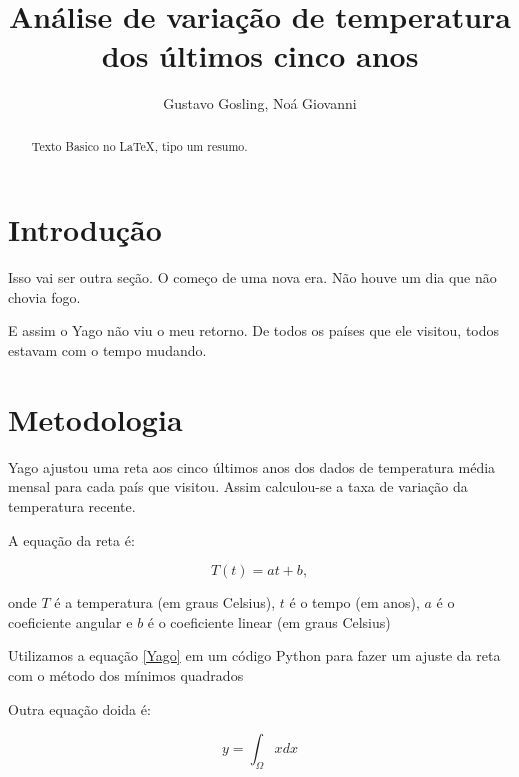 \documentclass{article}
\begin{document}
\title{Análise de variação de temperatura dos últimos cinco anos}
\author{Gustavo Gosling, Noá Giovanni}

\maketitle

\begin{abstract}
Texto Basico no LaTeX, tipo um resumo.

\end{abstract}

\section{Introdução}

Isso vai ser outra seção.
O começo de uma nova era. Não houve um dia que não chovia fogo.

E assim o Yago não viu o meu retorno. De todos os países que ele visitou,
 todos estavam com o tempo mudando.

\section{Metodologia}

Yago ajustou uma reta aos cinco últimos anos dos dados de temperatura
 média mensal para cada país que visitou.
Assim calculou-se a taxa de variação da temperatura recente.

A equação da reta é:

\begin{equation}
T(t)= a t + b,
\label{Yago}
\end{equation}

\noindent
onde $T$ é a temperatura (em graus Celsius), $t$ é o tempo (em anos),
 $a$ é o coeficiente angular e $b$ é o coeficiente linear (em graus Celsius)

Utilizamos a equação \ref{Yago} em um código Python para fazer um ajuste da reta com
o método dos mínimos quadrados

Outra equação doida é:

\begin{equation}
y = \int_\Omega x dx
\end{equation}
\end{document}
